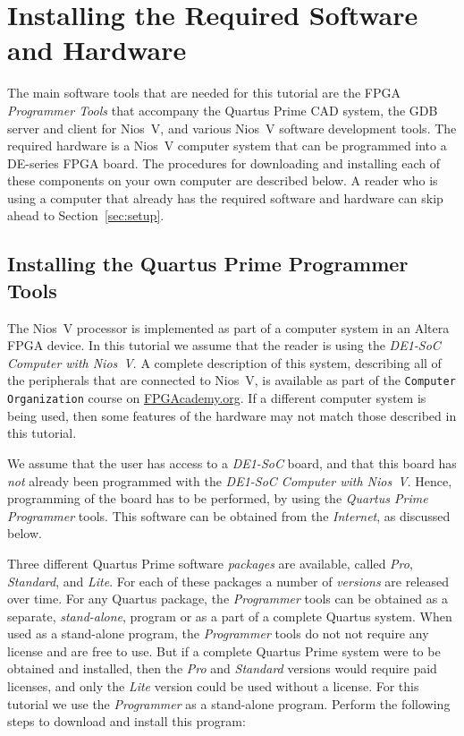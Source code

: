 \documentclass[11pt, twoside, pdftex]{article}
\begin{document}
\section{Installing the Required Software and Hardware}
\label{sec:getthem}

The main software tools that are needed for this tutorial are the FPGA {\it Programmer
Tools} that accompany the Quartus Prime CAD system, the GDB server and client for Nios~V, and 
various Nios~V software development tools. The required hardware is a Nios~V computer
system that can be programmed into a DE-series FPGA board. The procedures for downloading and 
installing each of these components on your own computer are described below. A reader who 
is using a computer that already has the required software and hardware can skip ahead to 
Section~\ref{sec:setup}. 

\subsection{Installing the Quartus Prime Programmer Tools}
\label{sec:programmer}

The Nios~V processor is implemented as part of a computer system in an Altera FPGA device. 
In this tutorial we assume that the reader is using the {\it DE1-SoC Computer with Nios~V}.
A complete description of this system, describing all of the peripherals that are
connected to Nios~V, is available as part of the \texttt{Computer Organization} course 
on {\small \href{https://www.fpgacademy.org/courses.html} {FPGAcademy.org}}. If a
different computer system is being used, then some features of the hardware may not match
those described in this tutorial.

We assume that the user has access to a {\it DE1-SoC} board, and that this board has {\it not} 
already been programmed with the {\it DE1-SoC Computer with Nios~V}. Hence, programming of 
the board has to be performed, by using the {\it Quartus Prime Programmer} tools. This 
software can be obtained from the {\it Internet}, as discussed below. 

Three different Quartus Prime software {\it packages} are available, called {\it Pro},
{\it Standard}, and {\it Lite}. For each of these packages a number of {\it versions} are
released over time.  For any Quartus package, the {\it Programmer} tools can be 
obtained as a separate, {\it stand-alone}, program or as a part of a complete 
Quartus system. When used as a stand-alone program, the {\it Programmer} tools do not 
not require any license and are free to use. But if a complete Quartus Prime system 
were to be obtained and installed, then the {\it Pro} and {\it Standard} versions would 
require paid licenses, and only the {\it Lite} version could be used without a license. For 
this tutorial we use the {\it Programmer} as a stand-alone program. Perform the following
steps to download and install this program:
\end{document}
